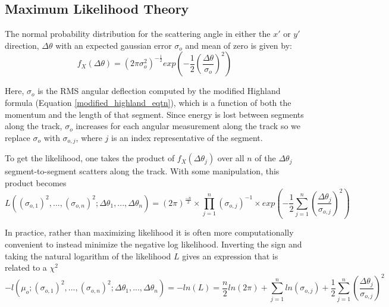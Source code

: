 \documentclass[a4paper,11pt]{article}
\begin{document}
\subsection{Maximum Likelihood Theory}\label{likelihood_theory_section}

The normal probability distribution for the scattering angle in either the $x'$ or $y'$ direction, $\Delta\theta$ with an expected gaussian error $\sigma_o$ and mean of zero is given by:
\begin{equation}
f_X(\Delta\theta) = (2\pi\sigma_o^2)^{-\frac{1}{2}}exp(-\frac{1}{2}(\frac{\Delta\theta}{\sigma_o})^2)
\end{equation}

Here, $\sigma_o$ is the RMS angular deflection computed by the modified Highland formula (Equation \ref{modified_highland_eqtn}), which is a function of both the momentum and the length of that segment. Since energy is lost between segments along the track, $\sigma_o$ increases for each angular measurement along the track so we replace $\sigma_o$ with $\sigma_{o,j}$, where $j$ is an index representative of the segment. \newline

To get the likelihood, one takes the product of $f_X(\Delta\theta_j)$ over all $n$ of the $\Delta\theta_j$ segment-to-segment scatters along the track. With some manipulation, this product becomes
\begin{equation}
L((\sigma_{o,1})^2,...,(\sigma_{o,n})^2;\Delta\theta_1,...,\Delta\theta_n) = (2\pi)^\frac{-n}{2}\times\prod_{j=1}^{n}(\sigma_{o,j})^{-1} \times exp(-\frac{1}{2}\sum_{j=1}^{n}(\frac{\Delta\theta_j}{\sigma_{o,j}})^2)
\end{equation}

In practice, rather than maximizing likelihood it is often more computationally convenient to instead minimize the negative log likelihood. Inverting the sign and taking the natural logarithm of the likelihood $L$ gives an expression that is related to a $\chi^2$
\begin{equation}\label{leo_llhd_eqtn}
-l(\mu_o;(\sigma_{o,1})^2,...,(\sigma_{o,n})^2;\Delta\theta_1,...,\Delta\theta_n) = -ln(L) = \frac{n}{2}ln(2\pi) + \sum_{j=1}^{n}ln(\sigma_{o,j}) + \frac{1}{2}\sum_{j=1}^{n}(\frac{\Delta\theta_j}{\sigma_{o,j}})^2
\end{equation}

\end{document}
